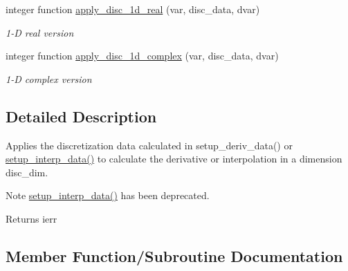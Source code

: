 \begin{DoxyCompactItemize}
integer function \hyperlink{interfacegrid__utilities_1_1apply__disc_a76de2220c19cb39b95621a917e4ee0b0}{apply\+\_\+disc\+\_\+1d\+\_\+real} (var, disc\+\_\+data, dvar)
\begin{DoxyCompactList}\small\item\em 1-\/D real version \end{DoxyCompactList}\item 
integer function \hyperlink{interfacegrid__utilities_1_1apply__disc_aef45b25e4b9529c6aa2bbb5fba22a7ba}{apply\+\_\+disc\+\_\+1d\+\_\+complex} (var, disc\+\_\+data, dvar)
\begin{DoxyCompactList}\small\item\em 1-\/D complex version \end{DoxyCompactList}\end{DoxyCompactItemize}


\subsection{Detailed Description}
Applies the discretization data calculated in setup\+\_\+deriv\+\_\+data() or \hyperlink{namespacegrid__utilities_ad059876fabae2c8445e5d3971ba28742}{setup\+\_\+interp\+\_\+data()} to calculate the derivative or interpolation in a dimension {\ttfamily disc\+\_\+dim}. 

\begin{DoxyNote}{Note}
\hyperlink{namespacegrid__utilities_ad059876fabae2c8445e5d3971ba28742}{setup\+\_\+interp\+\_\+data()} has been deprecated.
\end{DoxyNote}
\begin{DoxyReturn}{Returns}
ierr 
\end{DoxyReturn}


\subsection{Member Function/\+Subroutine Documentation}
\mbox{\label{interfacegrid__utilities_1_1apply__disc_aef45b25e4b9529c6aa2bbb5fba22a7ba}} 
